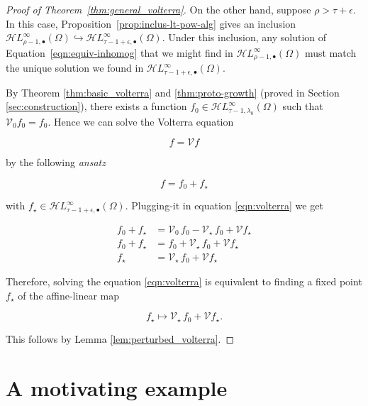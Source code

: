 \documentclass{article}
\theoremstyle{plain}
\newcommand{\singexp}[2]{\mathcal{H}L^\infty_{#1, #2}}
\newcommand{\singexpalg}[1]{\singexp{#1}{\bullet}}
\newcommand{\volterra}{\mathcal{V}}
\newcommand{\hardpart}{\mathcal{V}_0}
\newcommand{\softpart}{\mathcal{V}_\star}
\newcommand{\solproto}{f_0}
\begin{document}
\begin{proof}[Proof of Theorem~\ref{thm:general_volterra}]
On the other hand, suppose $\rho > \tau+\epsilon$. In this case, Proposition~\ref{prop:inclus-lt-pow-alg} gives an inclusion $\singexpalg{\rho-1}(\Omega) \hookrightarrow \singexpalg{\tau-1+\epsilon}(\Omega)$. Under this inclusion, any solution of Equation~\eqref{eqn:equiv-inhomog} that we might find in $\singexpalg{\rho-1}(\Omega)$ must match the unique solution we found in $\singexpalg{\tau-1+\epsilon}(\Omega)$.


\color{RoyalBlue}
By Theorem \ref{thm:basic_volterra} and \ref{thm:proto-growth} (proved in Section \ref{sec:construction}), there exists a function $f_0\in \singexp{\tau-1}{\lambda_0}(\Omega)$ such that $\hardpart f_0= f_0$. Hence we can solve the Volterra equation 

\begin{equation}\label{eqn:volterra}
    f = \volterra f
\end{equation} 

by the following \textit{ansatz}

\[ f= f_0 + f_\star\]

with $f_\star\in\singexpalg{\tau-1+\epsilon}(\Omega)$. Plugging-it in equation \eqref{eqn:volterra} we get 

\begin{align*}
    f_0 + f_\star & = \hardpart\,f_0 - \softpart \,f_0 + \volterra f_\star \\
f_0 + f_\star & = f_0 + \softpart \,f_0 + \volterra f_\star \\
f_\star & = \softpart \,f_0 + \volterra f_\star
\end{align*}

Therefore, solving the equation \eqref{eqn:volterra} is equivalent to finding a fixed point $f_\star$ of the affine-linear map

\[ f_\star \mapsto \softpart\,f_0 + \volterra f_\star. \]

This follows by Lemma \ref{lem:perturbed_volterra}.
\end{proof}


\section{A motivating example}\label{sec:example}
\end{document}
